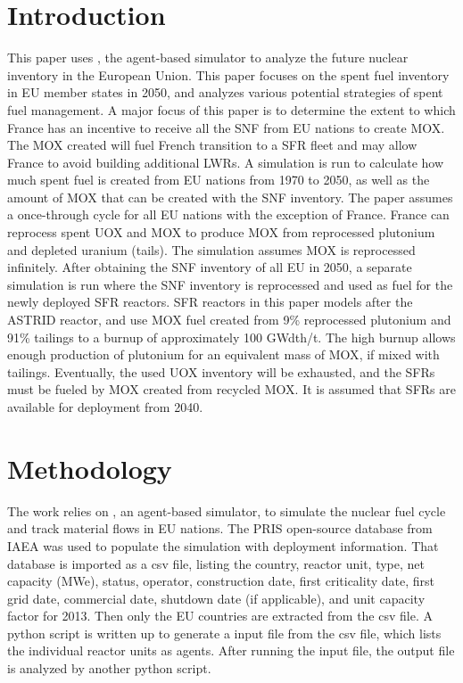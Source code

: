 \section{Introduction}
This paper uses \Cyclus, the agent-based simulator \cite{huff_fundamental_2016} to analyze
the future nuclear inventory in the European Union. This paper focuses on the spent fuel
inventory in \gls{EU} member states in 2050, and analyzes various potential strategies of spent fuel
management.
A major focus of this paper is to determine the extent to which France has an incentive
to receive all the \gls{SNF} from \gls{EU} nations to create \gls{MOX}.
The \gls{MOX} created will fuel French transition to a \gls{SFR} fleet
and may allow France to avoid building additional \glspl{LWR}.
A \Cyclus simulation is run to calculate
how much spent fuel is created from \gls{EU} nations from 1970 to 2050, as well as the amount
of \gls{MOX} that can be created with the \gls{SNF} inventory.
The paper assumes a once-through cycle for all 
\gls{EU} nations with the exception of France. France can reprocess spent \gls{UOX} and \gls{MOX} to
produce \gls{MOX} from reprocessed plutonium and depleted uranium (tails).
The simulation assumes \gls{MOX} is reprocessed infinitely. 
After obtaining the \gls{SNF} inventory of all \gls{EU} in 2050, a separate
simulation is run where the \gls{SNF} inventory is reprocessed and
used as fuel for the newly deployed \gls{SFR} reactors.
\gls{SFR} reactors in this paper models after the ASTRID reactor,
and use \gls{MOX} fuel created from 9\% reprocessed plutonium
and 91\% tailings to a burnup
of approximately 100 GWdth/t. The high burnup allows enough production of plutonium
for an equivalent mass of \gls{MOX}, if mixed with tailings.  Eventually,
the used \gls{UOX} inventory will be exhausted, and the \glspl{SFR} must be
fueled by \gls{MOX} created from recycled \gls{MOX}.
It is assumed that \glspl{SFR} are available for deployment
from 2040. 


\section{Methodology}
The work relies on \Cyclus, an agent-based simulator, to simulate the nuclear fuel cycle
and track material flows in \gls{EU} nations. The \gls{PRIS} open-source 
database from \gls{IAEA} was used to populate the simulation with deployment 
information. That database is imported as a csv file, listing the country, reactor unit, type, net capacity (MWe), status,
operator, construction date, first criticality date, first grid date, commercial date, shutdown
date (if applicable), and unit capacity factor for 2013. Then only the \gls{EU} countries are extracted
from the csv file. A python script is written up to generate a \Cyclus input file from the csv file,
which lists the individual reactor units as agents. After running the \Cyclus input file,
the output file is analyzed by another python script.


